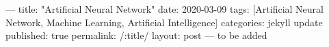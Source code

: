 ---
title: "Artificial Neural Network"
date: 2020-03-09
tags: [Artificial Neural Network, Machine Learning, Artificial Intelligence]
categories: jekyll update
published: true
permalink: /:title/
layout: post
---
to be added

